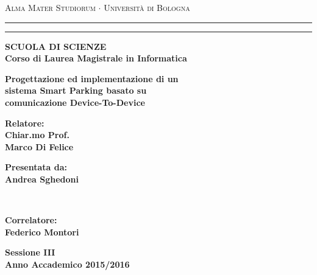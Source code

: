 \documentclass[12pt,a4paper]{report}
\begin{document}
\begin{titlepage}
\begin{center}
{{\Large{\textsc{Alma Mater Studiorum $\cdot$ Universit\`a di
Bologna}}}} \rule[0.1cm]{15.8cm}{0.1mm}
\rule[0.5cm]{15.8cm}{0.6mm}
{\small{\bf SCUOLA DI SCIENZE\\
Corso di Laurea Magistrale in Informatica}}
\end{center}
\vspace{15mm}
\begin{center}
{\LARGE{\bf Progettazione ed implementazione di un}}\\
\vspace{3mm}
{\LARGE{\bf sistema Smart Parking basato su}}\\
\vspace{3mm}
{\LARGE{\bf comunicazione Device-To-Device}}\\
\end{center}
\vspace{40mm}
\par
\noindent
\begin{minipage}[t]{0.47\textwidth}
{\large{\bf Relatore:\\
Chiar.mo Prof.\\
Marco Di Felice}}
\end{minipage}
\hfill
\begin{minipage}[t]{0.47\textwidth}\raggedleft
{\large{\bf Presentata da:\\
Andrea Sghedoni}}
\end{minipage}
\vspace{10mm}
\\\begin{minipage}[t]{0.47\textwidth}
{\large{\bf Correlatore:\\
Federico Montori}}
\end{minipage}
\vspace{13mm}
\begin{center}
{\large{\bf Sessione III\\
Anno Accademico 2015/2016}}
\end{center}
\end{titlepage}
\end{document}

